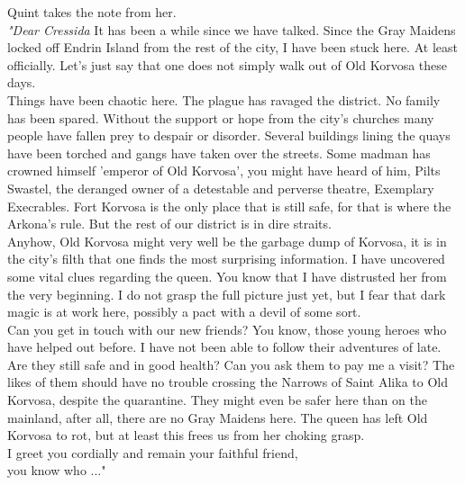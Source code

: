 Quint takes the note from her.\\

 {\itshape "Dear Cressida}  It has been a while since we have talked. Since the Gray Maidens locked off Endrin Island from the rest of the city, I have been stuck here. At least officially. Let's just say that one does not simply walk out of Old Korvosa these days.\\

Things have been chaotic here. The plague has ravaged the district. No family has been spared. Without the support or hope from the city's churches many people have fallen prey to despair or disorder. Several buildings lining the quays have been torched and gangs have taken over the streets. Some madman has crowned himself 'emperor of Old Korvosa', you might have heard of him, Pilts Swastel, the deranged owner of a detestable and perverse theatre, Exemplary Execrables. Fort Korvosa is the only place that is still safe, for that is where the Arkona's rule. But the rest of our district is in dire straits.\\

Anyhow, Old Korvosa might very well be the garbage dump of Korvosa, it is in the city's filth that one finds the most surprising information. I have uncovered some vital clues regarding the queen. You know that I have distrusted her from the very beginning. I do not grasp the full picture just yet, but I fear that dark magic is at work here, possibly a pact with a devil of some sort.\\

Can you get in touch with our new friends? You know, those young heroes who have helped out before. I have not been able to follow their adventures of late. Are they still safe and in good health? Can you ask them to pay me a visit? The likes of them should have no trouble crossing the Narrows of Saint Alika to Old Korvosa, despite the quarantine. They might even be safer here than on the mainland, after all, there are no Gray Maidens here. The queen has left Old Korvosa to rot, but at least this frees us from her choking grasp.\\

I greet you cordially and remain your faithful friend,\\

you know who ..."\\


